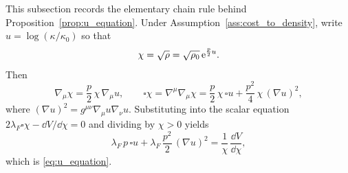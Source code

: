 This subsection records the elementary chain rule behind Proposition~\ref{prop:u_equation}.
Under Assumption~\ref{ass:cost_to_density}, write $u=\log(\kappa/\kappa_0)$ so that
\begin{equation}
  \chi=\sqrt{\rho}=\sqrt{\rho_0}\,\mathrm{e}^{\frac{p}{2}u}.
\end{equation}
Then
\begin{equation}
  \nabla_\mu\chi=\frac{p}{2}\,\chi\,\nabla_\mu u,
  \qquad
  \square\chi=\nabla^\mu\nabla_\mu\chi
  =\frac{p}{2}\,\chi\,\square u+\frac{p^2}{4}\,\chi\,(\nabla u)^2,
\end{equation}
where $(\nabla u)^2=g^{\mu\nu}\nabla_\mu u\nabla_\nu u$.
Substituting into the scalar equation $2\lambda_F\square\chi-\dd V/\dd\chi=0$ and dividing by $\chi>0$ yields
\begin{equation}
  \lambda_F\,p\,\square u+\lambda_F\,\frac{p^2}{2}\,(\nabla u)^2
  =\frac{1}{\chi}\,\frac{\dd V}{\dd\chi},
\end{equation}
which is \eqref{eq:u_equation}.


